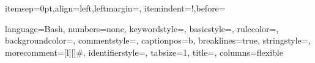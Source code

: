 \makeatletter
\def\BState{\State\hskip-\ALG@thistlm}
\makeatother

\makeatletter
\patchcmd{\@verbatim}
  {\verbatim@font}
  {\verbatim@font\scriptsize}
  {}{}
\makeatother

\newcommand*\makelabelcases[1]{\textit{Q.$#1$}:}
  {itemsep=0pt,align=left,leftmargin=\parindent,
   itemindent=!,before=\let\makelabel\makelabelcases}

   
   
\makeatletter
\newread\pin@file
{}
\newcommand\pin@accu{}
\newcommand\pin@ext{pintmp}
\newcommand*\partialinput [3] {%
  \IfFileExists{#3}{%
    \openin\pin@file #3
    \setcounter{pinlineno}{1}
    \@whilenum\value{pinlineno}<#1 \do{%
      \read\pin@file to\pin@line
      \stepcounter{pinlineno}%
    }
    \addtocounter{pinlineno}{-1}
    \let\pin@accu\empty
    \begingroup
    \endlinechar\newlinechar
    \@whilenum\value{pinlineno}<#2 \do{%
      \readline\pin@file to\pin@line
      \edef\pin@accu{\pin@accu\pin@line}%
      \stepcounter{pinlineno}%
    }
    \closein\pin@file
    \expandafter\endgroup
    \scantokens\expandafter{\pin@accu}%
  }{%
    \errmessage{File `#3' doesn't exist!}%
  }%
}
\makeatother




{ 
    language=Bash,
    numbers=none,     
    keywordstyle=\color{green}\sf,    
    basicstyle=\scriptsize\ttfamily,
    rulecolor=\color{white},
    backgroundcolor=\color{gray},
    commentstyle=\color{gray},
    captionpos=b,    
    breaklines=true,    
    stringstyle=\color{red!60},
    morecomment=[l][\color{magenta}]{\#},
    identifierstyle=\color{green},  
    tabsize=1,
    title=\lstname,
    columns=flexible
}


